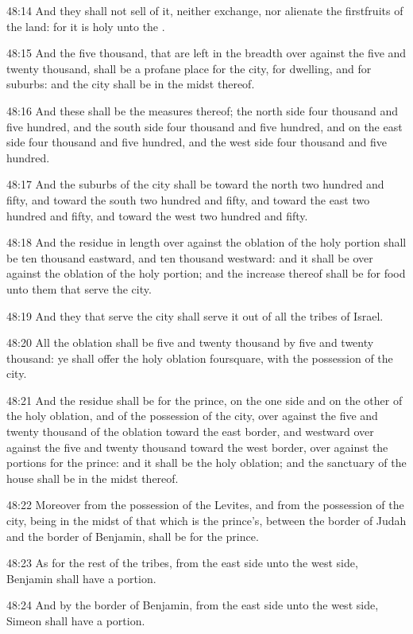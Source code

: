 48:14 And they shall not sell of it, neither exchange, nor alienate
the firstfruits of the land: for it is holy unto the \LORD.

48:15 And the five thousand, that are left in the breadth over against
the five and twenty thousand, shall be a profane place for the city,
for dwelling, and for suburbs: and the city shall be in the midst
thereof.

48:16 And these shall be the measures thereof; the north side four
thousand and five hundred, and the south side four thousand and five
hundred, and on the east side four thousand and five hundred, and the
west side four thousand and five hundred.

48:17 And the suburbs of the city shall be toward the north two
hundred and fifty, and toward the south two hundred and fifty, and
toward the east two hundred and fifty, and toward the west two hundred
and fifty.

48:18 And the residue in length over against the oblation of the holy
portion shall be ten thousand eastward, and ten thousand westward: and
it shall be over against the oblation of the holy portion; and the
increase thereof shall be for food unto them that serve the city.

48:19 And they that serve the city shall serve it out of all the
tribes of Israel.

48:20 All the oblation shall be five and twenty thousand by five and
twenty thousand: ye shall offer the holy oblation foursquare, with the
possession of the city.

48:21 And the residue shall be for the prince, on the one side and on
the other of the holy oblation, and of the possession of the city,
over against the five and twenty thousand of the oblation toward the
east border, and westward over against the five and twenty thousand
toward the west border, over against the portions for the prince: and
it shall be the holy oblation; and the sanctuary of the house shall be
in the midst thereof.

48:22 Moreover from the possession of the Levites, and from the
possession of the city, being in the midst of that which is the
prince's, between the border of Judah and the border of Benjamin,
shall be for the prince.

48:23 As for the rest of the tribes, from the east side unto the west
side, Benjamin shall have a portion.

48:24 And by the border of Benjamin, from the east side unto the west
side, Simeon shall have a portion.

